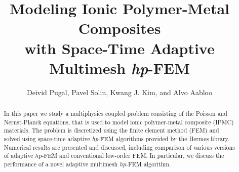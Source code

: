 \documentclass[mathpazo]{cicp}
\begin{document}
\title{Modeling Ionic Polymer-Metal Composites\\ with Space-Time Adaptive Multimesh \emph{hp}-FEM}


\author[Deivid Pugal et.~al.]{Deivid Pugal\comma{},
Pavel Solin\comma{}\comma\corrauth,
Kwang J. Kim, and Alvo Aabloo}

\address{\ Mechanical Engineering Department, University of Nevada, Reno, NV, U.S.A.\\
\ Institute of Technology, Tartu University, Estonia\\
\ Department of Mathematics and Statistics, University of Nevada, Reno, NV, U.S.A.\\
\ Institute of Thermomechanics, Prague, Czech Republic}


%
%
%
%
%

\begin{abstract}
In this paper we study a multiphysics coupled problem consisting 
of the Poisson and Nernst-Planck equations, that is used to 
model ionic polymer-metal composite (IPMC) materials. 
The problem is discretized using the finite element method (FEM) and solved using 
space-time adaptive \emph{hp}-FEM algorithms provided by the Hermes 
library. Numerical results are presented and discussed, including 
comparison of various versions of adaptive $hp$-FEM and conventional 
low-order FEM. In particular, we discuss the performance of a novel
adaptive multimesh $hp$-FEM algorithm.
\end{abstract}
\end{document}
